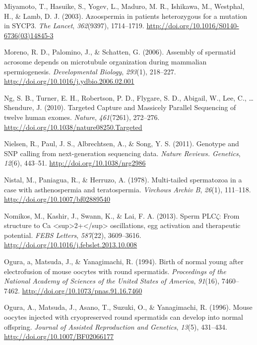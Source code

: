 \documentclass[12pt,twoside]{reedthesis}
\theoremstyle{definition}
\theoremstyle{definition}
\theoremstyle{remark}
\begin{document}
  \hypertarget{ref-Miyamoto2003}{}
  Miyamoto, T., Hasuike, S., Yogev, L., Maduro, M. R., Ishikawa, M.,
  Westphal, H., \& Lamb, D. J. (2003). Azoospermia in patients
  heterozygous for a mutation in SYCP3. \emph{The Lancet},
  \emph{362}(9397), 1714--1719.
  \url{http://doi.org/10.1016/S0140-6736(03)14845-3}
  
  \hypertarget{ref-Moreno2006}{}
  Moreno, R. D., Palomino, J., \& Schatten, G. (2006). Assembly of
  spermatid acrosome depends on microtubule organization during mammalian
  spermiogenesis. \emph{Developmental Biology}, \emph{293}(1), 218--227.
  \url{http://doi.org/10.1016/j.ydbio.2006.02.001}
  
  \hypertarget{ref-Ng2010}{}
  Ng, S. B., Turner, E. H., Robertson, P. D., Flygare, S. D., Abigail, W.,
  Lee, C., \ldots{} Shendure, J. (2010). Targeted Capture and Massicely
  Parallel Sequencing of twelve human exomes. \emph{Nature},
  \emph{461}(7261), 272--276.
  \url{http://doi.org/10.1038/nature08250.Targeted}
  
  \hypertarget{ref-Nielsen2011}{}
  Nielsen, R., Paul, J. S., Albrechtsen, A., \& Song, Y. S. (2011).
  Genotype and SNP calling from next-generation sequencing data.
  \emph{Nature Reviews. Genetics}, \emph{12}(6), 443--51.
  \url{http://doi.org/10.1038/nrg2986}
  
  \hypertarget{ref-Nistal}{}
  Nistal, M., Paniagua, R., \& Herruzo, A. (1978). Multi-tailed
  spermatozoa in a case with asthenospermia and teratospermia.
  \emph{Virchows Archiv B}, \emph{26}(1), 111--118.
  \url{http://doi.org/10.1007/bf02889540}
  
  \hypertarget{ref-Nomikos2013}{}
  Nomikos, M., Kashir, J., Swann, K., \& Lai, F. A. (2013). Sperm
  PLC\(\zeta\): From structure to Ca
  \textless{}sup\textgreater{}2+\textless{}/sup\textgreater{}
  oscillations, egg activation and therapeutic potential. \emph{FEBS
  Letters}, \emph{587}(22), 3609--3616.
  \url{http://doi.org/10.1016/j.febslet.2013.10.008}
  
  \hypertarget{ref-Ogura1994}{}
  Ogura, a, Matsuda, J., \& Yanagimachi, R. (1994). Birth of normal young
  after electrofusion of mouse oocytes with round spermatids.
  \emph{Proceedings of the National Academy of Sciences of the United
  States of America}, \emph{91}(16), 7460--7462.
  \url{http://doi.org/10.1073/pnas.91.16.7460}
  
  \hypertarget{ref-Kimura1995}{}
  Ogura, A., Matsuda, J., Asano, T., Suzuki, O., \& Yanagimachi, R.
  (1996). Mouse oocytes injected with cryopreserved round spermatids can
  develop into normal offspring. \emph{Journal of Assisted Reproduction
  and Genetics}, \emph{13}(5), 431--434.
  \url{http://doi.org/10.1007/BF02066177}
  
\end{document}
